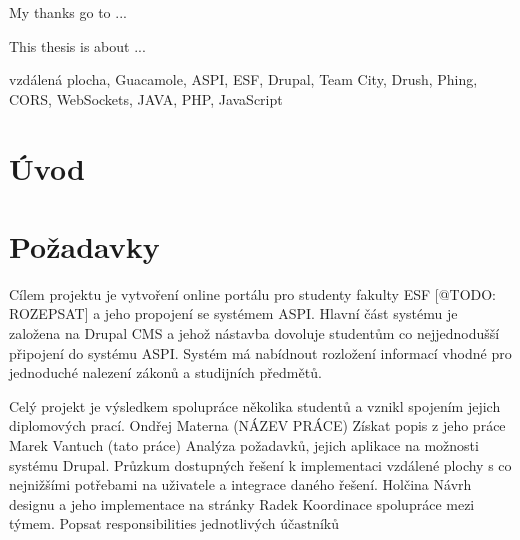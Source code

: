 \documentclass[11pt,draft,oneside]{fithesis2}
\begin{document}
\FrontMatter
\ThesisTitlePage

\begin{ThesisDeclaration}
  \DeclarationText
  \AdvisorName
\end{ThesisDeclaration}

\begin{ThesisThanks}
My thanks go to ... 
\end{ThesisThanks}

\begin{ThesisAbstract}
This thesis is about ...
\end{ThesisAbstract}

\begin{ThesisKeyWords}
vzdálená plocha, Guacamole, ASPI, ESF, Drupal, Team City, Drush, Phing, CORS, WebSockets, JAVA, PHP, JavaScript
\end{ThesisKeyWords}

\MainMatter

\tableofcontents

\chapter{Úvod}

\chapter{Požadavky}

Cílem projektu je vytvoření online portálu pro studenty fakulty ESF [@TODO: ROZEPSAT] a jeho propojení se systémem ASPI. %
Hlavní část systému je založena na Drupal CMS a jehož nástavba dovoluje studentům co nejjednodušší připojení do systému ASPI. Systém má nabídnout rozložení informací vhodné pro jednoduché nalezení zákonů a studijních předmětů. 

Celý projekt je výsledkem spolupráce několika studentů a vznikl spojením jejich diplomových prací.
Ondřej Materna (NÁZEV PRÁCE)
Získat popis z jeho práce
Marek Vantuch (tato práce) 
Analýza požadavků, jejich aplikace na možnosti systému Drupal. 
Průzkum dostupných řešení k implementaci vzdálené plochy s co nejnižšími potřebami na uživatele a integrace daného řešení.
Holčina
Návrh designu a jeho implementace na stránky
Radek 
Koordinace spolupráce mezi týmem.
Popsat responsibilities jednotlivých účastníků
\end{document}
